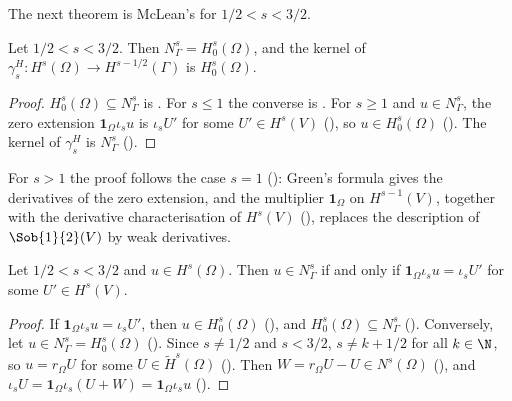 The next theorem is McLean's \cite[Theorem 3.40]{McLean} for $1/2 < s < 3/2$.

\begin{theorem}
\label{thm:sobolev-trace-kernel}
\leanok
{}
Let $1/2 < s < 3/2$. Then $N^s_\Gamma = H^s_0(\Omega)$, and the kernel of
$\gamma^H_s \colon H^s(\Omega) \to H^{s-1/2}(\Gamma)$ is $H^s_0(\Omega)$.
\end{theorem}

\begin{proof}
\leanok
$H^s_0(\Omega) \subseteq N^s_\Gamma$ is . For $s \leq 1$ the
converse is . For $s \geq 1$ and $u \in N^s_\Gamma$, the zero
extension $\mathbf 1_\Omega \iota_s u$ is $\iota_s U'$ for some $U' \in H^s(V)$
(), so $u \in H^s_0(\Omega)$
(). The kernel of $\gamma^H_s$ is $N^s_\Gamma$
().
\end{proof}

For $s > 1$ the proof follows the case $s = 1$ (): Green's
formula gives the derivatives of the zero extension, and the multiplier $\mathbf 1_\Omega$ on
$H^{s-1}(V)$, together with the derivative characterisation of $H^s(V)$
(), replaces the description of $\Sob{1}{2}(V)$ by weak
derivatives.

\begin{corollary}
\label{cor:sobolev-trace-kernel-zero-extension}
\leanok
{}
Let $1/2 < s < 3/2$ and $u \in H^s(\Omega)$. Then $u \in N^s_\Gamma$ if and only if
$\mathbf 1_\Omega \iota_s u = \iota_s U'$ for some $U' \in H^s(V)$.
\end{corollary}

\begin{proof}
\leanok
If $\mathbf 1_\Omega \iota_s u = \iota_s U'$, then $u \in H^s_0(\Omega)$
(), and $H^s_0(\Omega) \subseteq N^s_\Gamma$
(). Conversely, let $u \in N^s_\Gamma = H^s_0(\Omega)$
(). Since $s \neq 1/2$ and $s < 3/2$, $s \neq k + 1/2$ for all
$k \in \N$, so $u = r_\Omega U$ for some $U \in \tilde H^s(\Omega)$
(). Then $W = r_\Omega U - U \in N^s(\Omega)$
(), and
$\iota_s U = \mathbf 1_\Omega \iota_s(U + W) = \mathbf 1_\Omega \iota_s u$
().
\end{proof}

